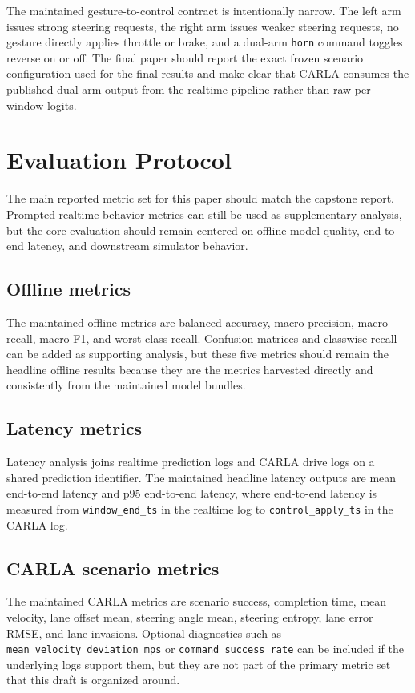 \documentclass[11pt]{article}
\begin{document}
The maintained gesture-to-control contract is intentionally narrow. The left arm issues strong steering requests, the right arm issues weaker steering requests, no gesture directly applies throttle or brake, and a dual-arm \texttt{horn} command toggles reverse on or off. The final paper should report the exact frozen scenario configuration used for the final results and make clear that CARLA consumes the published dual-arm output from the realtime pipeline rather than raw per-window logits.

\section{Evaluation Protocol}
The main reported metric set for this paper should match the capstone report. Prompted realtime-behavior metrics can still be used as supplementary analysis, but the core evaluation should remain centered on offline model quality, end-to-end latency, and downstream simulator behavior.

\subsection{Offline metrics}
The maintained offline metrics are balanced accuracy, macro precision, macro recall, macro F1, and worst-class recall. Confusion matrices and classwise recall can be added as supporting analysis, but these five metrics should remain the headline offline results because they are the metrics harvested directly and consistently from the maintained model bundles.

\subsection{Latency metrics}
Latency analysis joins realtime prediction logs and CARLA drive logs on a shared prediction identifier. The maintained headline latency outputs are mean end-to-end latency and p95 end-to-end latency, where end-to-end latency is measured from \texttt{window\_end\_ts} in the realtime log to \texttt{control\_apply\_ts} in the CARLA log.

\subsection{CARLA scenario metrics}
The maintained CARLA metrics are scenario success, completion time, mean velocity, lane offset mean, steering angle mean, steering entropy, lane error RMSE, and lane invasions. Optional diagnostics such as \texttt{mean\_velocity\_deviation\_mps} or \texttt{command\_success\_rate} can be included if the underlying logs support them, but they are not part of the primary metric set that this draft is organized around.
\end{document}
